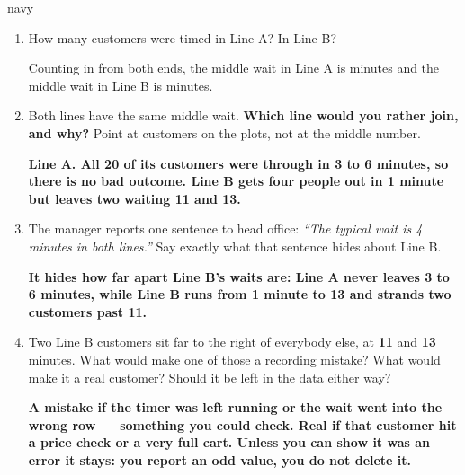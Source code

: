 \documentclass[12pt]{article}
\newcommand{\answerspace}[2]{\par\nopagebreak\noindent\begin{minipage}[t][#1][t]{\linewidth}%
  \color{keyred}\bfseries #2\end{minipage}\par}
\begin{document}
\begin{scenariobox}{navy}
\normalsize
\begin{enumerate}[label=\textbf{\alph*.}, leftmargin=1.8em, itemsep=4pt]
  \item How many customers were timed in Line A?  \quad In Line B? 

        \vspace{3pt}
        Counting in from both ends, the middle wait in Line A is  minutes and the
        middle wait in Line B is  minutes.
  \item Both lines have the same middle wait. \textbf{Which line would you rather join, and
        why?} Point at customers on the plots, not at the middle number.
        \answerspace{1.6cm}{Line A. All 20 of its customers were through in 3 to 6 minutes, so
        there is no bad outcome. Line B gets four people out in 1 minute but leaves two waiting
        11 and 13.}
  \item The manager reports one sentence to head office: \emph{``The typical wait is 4 minutes
        in both lines.''} Say exactly what that sentence hides about Line B.
        \answerspace{1.6cm}{It hides how far apart Line B's waits are: Line A never leaves 3 to
        6 minutes, while Line B runs from 1 minute to 13 and strands two customers past 11.}
  \item Two Line B customers sit far to the right of everybody else, at \textbf{11} and
        \textbf{13} minutes. What would make one of those a recording mistake? What would make
        it a real customer? Should it be left in the data either way?
        \answerspace{2.0cm}{A mistake if the timer was left running or the wait went into the
        wrong row --- something you could check. Real if that customer hit a price check or a
        very full cart. Unless you can show it was an error it stays: you report an odd value,
        you do not delete it.}
\end{enumerate}
\end{scenariobox}
\end{document}

